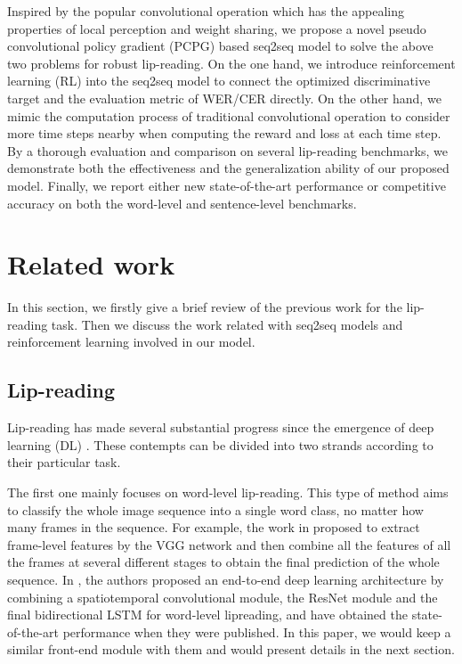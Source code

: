 \documentclass[a4paper, 10pt, conference]{ieeeconf}      \usepackage{FG2020}
\begin{document}
Inspired by the popular convolutional operation which has the appealing properties of local perception and weight sharing, we propose a novel pseudo convolutional policy gradient (PCPG) based seq2seq model to solve the above two problems for robust lip-reading. On the one hand, we introduce reinforcement learning (RL) into the seq2seq model to connect the optimized discriminative target and the evaluation metric of WER/CER directly. On the other hand, we mimic the computation process of traditional convolutional operation to consider more time steps nearby when computing the reward and loss at each time step. By a thorough evaluation and comparison on several lip-reading benchmarks, we demonstrate both the effectiveness and the generalization ability of our proposed model. Finally, we report either new state-of-the-art performance or competitive accuracy on both the word-level and sentence-level benchmarks.


\section{Related work}
In this section, we firstly give a brief review of the previous work for the lip-reading task. Then we discuss the work related with seq2seq models and reinforcement learning involved in our model.

\subsection{Lip-reading}
Lip-reading has made several substantial progress since the emergence of deep learning (DL) \cite{Chung2018, Chung, Chung2017, B2017, Petridis2018, Assael2016, Afouras, Zhou2014, Yang2019, Hu2016}. These contempts can be divided into two strands according to their particular task. 

The first one mainly focuses on word-level lip-reading. This type of method aims to classify the whole image sequence into a single word class, no matter how many frames in the sequence. For example, the work in \cite{Chung2017} proposed to extract frame-level features by the VGG network and then combine all the features of all the frames at several different stages to obtain the final prediction of the whole sequence. 
In \cite{Stafylakis2017},  the authors proposed an end-to-end deep learning architecture by combining a spatiotemporal convolutional module, the ResNet module and the final bidirectional LSTM for word-level lipreading, and have obtained the state-of-the-art performance when they were published. In this paper, we would keep a similar front-end module with them and would present details in the next section. 
\end{document}
